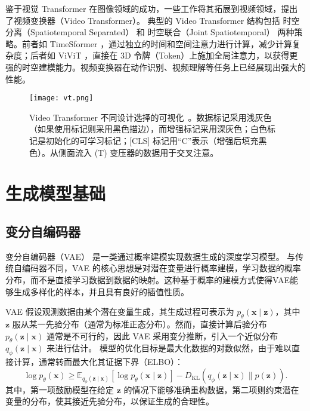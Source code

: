 鉴于视觉 Transformer 在图像领域的成功，一些工作将其拓展到视频领域，提出了视频变换器（Video Transformer）。
典型的 Video Transformer 结构包括 时空分离（Spatiotemporal Separated） 和 时空联合（Joint Spatiotemporal） 两种策略。前者如 TimeSformer \cite{bertasius2021space}，通过独立的时间和空间注意力进行计算，减少计算复杂度；后者如 ViViT \cite{arnab2021vivit}，直接在 3D 令牌（Token）上施加全局注意力，以获得更强的时空建模能力。视频变换器在动作识别、视频理解等任务上已经展现出强大的性能。

\begin{figure}[htbp]
    \centering
    \texttt{[image: vt.png]}
    \caption{Video Transformer 不同设计选择的可视化~\cite{selva2023video}。数据标记采用浅灰色（如果使用标记则采用黑色描边），而增强标记采用深灰色；白色标记是初始化的可学习标记；[CLS] 标记用“C”表示（增强后填充黑色）。从侧面流入 (T) 变压器的数据用于交叉注意。}
    \label{fig:vt}
\end{figure}

\section{生成模型基础}

\subsection{变分自编码器}

变分自编码器（VAE）\cite{kingma2013vae} 是一类通过概率建模实现数据生成的深度学习模型。
与传统自编码器不同，VAE 的核心思想是对潜在变量进行概率建模，学习数据的概率分布，而不是直接学习数据到数据的映射。这种基于概率的建模方式使得VAE能够生成多样化的样本，并且具有良好的插值性质。

VAE 假设观测数据由某个潜在变量生成，其生成过程可表示为 $p_{\theta}(\mathbf{x} \mid \mathbf{z})$，其中 $\mathbf{z}$ 服从某一先验分布（通常为标准正态分布）。然而，直接计算后验分布 $p_{\theta}(\mathbf{z} \mid \mathbf{x})$ 通常是不可行的，因此 VAE 采用变分推断，引入一个近似分布 $q_{\phi}(\mathbf{z} \mid \mathbf{x})$ 来进行估计。
模型的优化目标是最大化数据的对数似然，由于难以直接计算，通常转而最大化其证据下界（ELBO）：
\begin{equation}
    \log p_{\theta}(\mathbf{x}) \geq \mathbb{E}_{q_{\phi}(\mathbf{z} \mid \mathbf{x})} \left[ \log p_{\theta}(\mathbf{x} \mid \mathbf{z}) \right] - D_{\mathrm{KL}} \left( q_{\phi}(\mathbf{z} \mid \mathbf{x}) \parallel p(\mathbf{z}) \right).
\end{equation}
其中，第一项鼓励模型在给定 $\mathbf{z}$ 的情况下能够准确重构数据，第二项则约束潜在变量的分布，使其接近先验分布，以保证生成的合理性。

